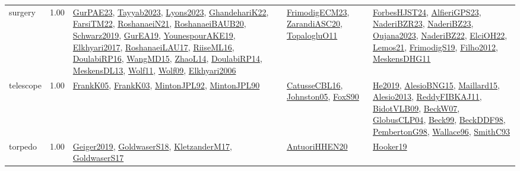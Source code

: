 {\begin{longtable}{p{3cm}r>{\raggedright\arraybackslash}p{6cm}>{\raggedright\arraybackslash}p{6cm}>{\raggedright\arraybackslash}p{8cm}}
\index{surgery}\index{ApplicationAreas!surgery}surgery &  1.00 & \hyperref[detail:GurPAE23]{GurPAE23}, \hyperref[detail:Tayyab2023]{Tayyab2023}, \hyperref[detail:Lyons2023]{Lyons2023}, \hyperref[detail:GhandehariK22]{GhandehariK22}, \hyperref[detail:FarsiTM22]{FarsiTM22}, \hyperref[detail:RoshanaeiN21]{RoshanaeiN21}, \hyperref[detail:RoshanaeiBAUB20]{RoshanaeiBAUB20}, \hyperref[detail:Schwarz2019]{Schwarz2019}, \hyperref[detail:GurEA19]{GurEA19}, \hyperref[detail:YounespourAKE19]{YounespourAKE19}, \hyperref[detail:Elkhyari2017]{Elkhyari2017}, \hyperref[detail:RoshanaeiLAU17]{RoshanaeiLAU17}, \hyperref[detail:RiiseML16]{RiiseML16}, \hyperref[detail:DoulabiRP16]{DoulabiRP16}, \hyperref[detail:WangMD15]{WangMD15}, \hyperref[detail:ZhaoL14]{ZhaoL14}, \hyperref[detail:DoulabiRP14]{DoulabiRP14}, \hyperref[detail:MeskensDL13]{MeskensDL13}, \hyperref[detail:Wolf11]{Wolf11}, \hyperref[detail:Wolf09]{Wolf09}, \hyperref[detail:Elkhyari2006]{Elkhyari2006} & \hyperref[detail:FrimodigECM23]{FrimodigECM23}, \hyperref[detail:ZarandiASC20]{ZarandiASC20}, \hyperref[detail:TopalogluO11]{TopalogluO11} & \hyperref[detail:ForbesHJST24]{ForbesHJST24}, \hyperref[detail:AlfieriGPS23]{AlfieriGPS23}, \hyperref[detail:NaderiBZR23]{NaderiBZR23}, \hyperref[detail:NaderiBZ23]{NaderiBZ23}, \hyperref[detail:Oujana2023]{Oujana2023}, \hyperref[detail:NaderiBZ22]{NaderiBZ22}, \hyperref[detail:ElciOH22]{ElciOH22}, \hyperref[detail:Lemos21]{Lemos21}, \hyperref[detail:FrimodigS19]{FrimodigS19}, \hyperref[detail:Filho2012]{Filho2012}, \hyperref[detail:MeskensDHG11]{MeskensDHG11}\\
\index{telescope}\index{ApplicationAreas!telescope}telescope &  1.00 & \hyperref[detail:FrankK05]{FrankK05}, \hyperref[detail:FrankK03]{FrankK03}, \hyperref[detail:MintonJPL92]{MintonJPL92}, \hyperref[detail:MintonJPL90]{MintonJPL90} & \hyperref[detail:CatusseCBL16]{CatusseCBL16}, \hyperref[detail:Johnston05]{Johnston05}, \hyperref[detail:FoxS90]{FoxS90} & \hyperref[detail:He2019]{He2019}, \hyperref[detail:AlesioBNG15]{AlesioBNG15}, \hyperref[detail:Maillard15]{Maillard15}, \hyperref[detail:Alesio2013]{Alesio2013}, \hyperref[detail:ReddyFIBKAJ11]{ReddyFIBKAJ11}, \hyperref[detail:BidotVLB09]{BidotVLB09}, \hyperref[detail:BeckW07]{BeckW07}, \hyperref[detail:GlobusCLP04]{GlobusCLP04}, \hyperref[detail:Beck99]{Beck99}, \hyperref[detail:BeckDDF98]{BeckDDF98}, \hyperref[detail:PembertonG98]{PembertonG98}, \hyperref[detail:Wallace96]{Wallace96}, \hyperref[detail:SmithC93]{SmithC93}\\
\index{torpedo}\index{ApplicationAreas!torpedo}torpedo &  1.00 & \hyperref[detail:Geiger2019]{Geiger2019}, \hyperref[detail:GoldwaserS18]{GoldwaserS18}, \hyperref[detail:KletzanderM17]{KletzanderM17}, \hyperref[detail:GoldwaserS17]{GoldwaserS17} & \hyperref[detail:AntuoriHHEN20]{AntuoriHHEN20} & \hyperref[detail:Hooker19]{Hooker19}\\

\end{longtable}}
